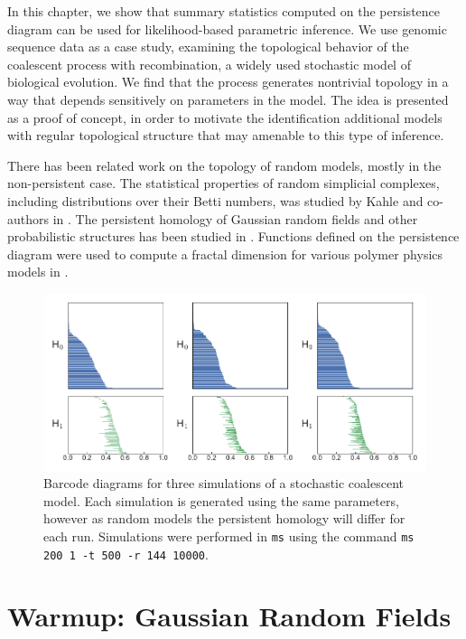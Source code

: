 In this chapter, we show that summary statistics computed on the persistence diagram can be used for likelihood-based parametric inference.
We use genomic sequence data as a case study, examining the topological behavior of the coalescent process with recombination, a widely used stochastic model of biological evolution.
We find that the process generates nontrivial topology in a way that depends sensitively on parameters in the model.
The idea is presented as a proof of concept, in order to motivate the identification additional models with regular topological structure that may amenable to this type of inference.

There has been related work on the topology of random models, mostly in the non-persistent case.
The statistical properties of random simplicial complexes, including distributions over their Betti numbers, was studied by Kahle and co-authors in \cite{Kahle:2011ep,Kahle:2013vy}.
The persistent homology of Gaussian random fields and other probabilistic structures has been studied in \cite{Adler:2010}.
Functions defined on the persistence diagram were used to compute a fractal dimension for various polymer physics models in \cite{MacPherson:2012eq}.

\begin{figure}
\centering
\includegraphics[width=\textwidth]{fig/parametric_inference/sim_barcodes.pdf}
\caption[Barcode Diagrams for Three Coalescent Simulations]{Barcode diagrams for three simulations of a stochastic coalescent model. Each simulation is generated using the same parameters, however as random models the persistent homology will differ for each run. Simulations were performed in \texttt{ms} using the command \texttt{ms 200 1 -t 500 -r 144 10000}.}
\label{fig:sim_barcodes}
\end{figure}

\section{Warmup: Gaussian Random Fields}

